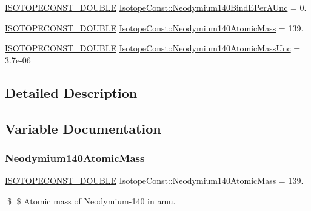 \begin{DoxyCompactItemize}
\mbox{\hyperlink{group___isotope_const-_macros_ga8f45a7272ce02c0b4c65c44636ed719a}{I\+S\+O\+T\+O\+P\+E\+C\+O\+N\+S\+T\+\_\+\+D\+O\+U\+B\+LE}} \mbox{\hyperlink{group___isotope_const-_neodymium-_nd140_ga4d61a11b3749fdf262611bbf488fcf78}{Isotope\+Const\+::\+Neodymium140\+Bind\+E\+Per\+A\+Unc}} = 0.
\item 
\mbox{\hyperlink{group___isotope_const-_macros_ga8f45a7272ce02c0b4c65c44636ed719a}{I\+S\+O\+T\+O\+P\+E\+C\+O\+N\+S\+T\+\_\+\+D\+O\+U\+B\+LE}} \mbox{\hyperlink{group___isotope_const-_neodymium-_nd140_ga41d70796984a0703fe69879aac2d2679}{Isotope\+Const\+::\+Neodymium140\+Atomic\+Mass}} = 139.
\item 
\mbox{\hyperlink{group___isotope_const-_macros_ga8f45a7272ce02c0b4c65c44636ed719a}{I\+S\+O\+T\+O\+P\+E\+C\+O\+N\+S\+T\+\_\+\+D\+O\+U\+B\+LE}} \mbox{\hyperlink{group___isotope_const-_neodymium-_nd140_ga577f3abf597a2d14999a7890194fceaa}{Isotope\+Const\+::\+Neodymium140\+Atomic\+Mass\+Unc}} = 3.\+7e-\/06
\end{DoxyCompactItemize}


\subsection{Detailed Description}


\subsection{Variable Documentation}
\mbox{\label{group___isotope_const-_neodymium-_nd140_ga41d70796984a0703fe69879aac2d2679}} 
\subsubsection{\texorpdfstring{Neodymium140\+Atomic\+Mass}{Neodymium140AtomicMass}}
{\footnotesize\ttfamily \mbox{\hyperlink{group___isotope_const-_macros_ga8f45a7272ce02c0b4c65c44636ed719a}{I\+S\+O\+T\+O\+P\+E\+C\+O\+N\+S\+T\+\_\+\+D\+O\+U\+B\+LE}} Isotope\+Const\+::\+Neodymium140\+Atomic\+Mass = 139.}

\$ \$ Atomic mass of Neodymium-\/140 in amu. \mbox{\label{group___isotope_const-_neodymium-_nd140_ga577f3abf597a2d14999a7890194fceaa}} 
